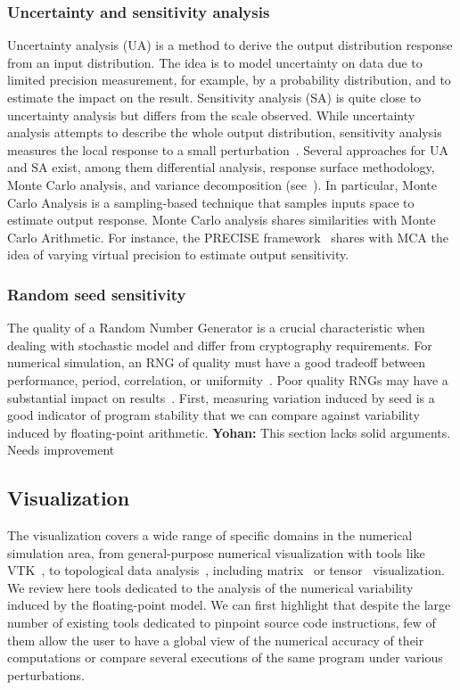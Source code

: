 \documentclass[11pt]{article}
\newcommand{\Yohan}[1]{\color{green!75!black}\textbf{Yohan:} #1\color{black}\xspace}
\begin{document}
\subsubsection{Uncertainty and sensitivity analysis}

Uncertainty analysis (UA) is a method to derive the output distribution response from an input distribution.
The idea is to model uncertainty on data due to limited precision measurement, for example, by a probability distribution, and to estimate the impact on the result. 
Sensitivity analysis (SA) is quite close to uncertainty analysis but differs from the scale observed.
While uncertainty analysis attempts to describe the whole output distribution, sensitivity analysis measures the local response to a small perturbation~\cite{loucks2017water}. 
Several approaches for UA and SA exist, among them differential analysis, response surface methodology, Monte Carlo analysis, and variance decomposition (see~\cite{helton2006survey}). In particular, Monte Carlo Analysis is a sampling-based technique that samples inputs space to estimate output response. Monte Carlo analysis shares similarities with Monte Carlo Arithmetic. For instance, the PRECISE framework~\cite{chaitin1996lectures} shares with MCA the idea of varying virtual precision to estimate output sensitivity.

\subsubsection{Random seed sensitivity}


The quality of a Random Number Generator is a crucial characteristic when dealing with stochastic model and differ from cryptography requirements. For numerical simulation, an RNG of quality must have a good tradeoff between performance, period, correlation, or uniformity~\cite{james2020review}. Poor quality RNGs may have a substantial impact on results~\cite{click2011quality}. First, measuring variation induced by seed is a good indicator of program stability that we can compare against variability induced by floating-point arithmetic.
\Yohan{This section lacks solid arguments. Needs improvement}

\subsection{Visualization}

The visualization covers a wide range of specific domains in the numerical simulation area, from general-purpose numerical visualization with tools
like VTK~\cite{schroeder2000visualizing}, to topological data analysis~\cite{tierny2018topological}, including matrix~\cite{wu2008matrix} or tensor~\cite{kindlmann2006diffusion} visualization.
We review here tools dedicated to the analysis of the numerical variability induced by the floating-point model. We can first highlight that despite the large number of existing tools dedicated to pinpoint source code instructions, few of them allow the user to have a global view of the numerical accuracy of their computations or compare several executions of the same program under various perturbations.
\end{document}

